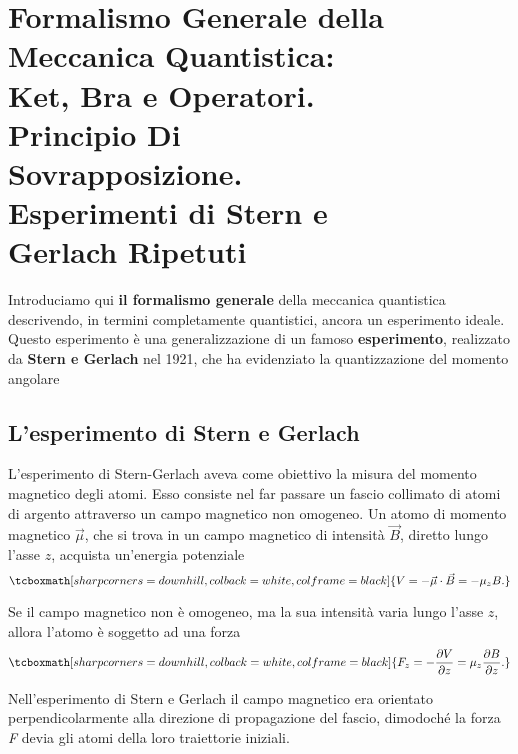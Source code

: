 \chapter[Formalismo Generale della M.Q.]{Formalismo Generale della Meccanica Quantistica: \\Ket, Bra e Operatori.\\Principio Di\\ Sovrapposizione.\\ Esperimenti di Stern e\\ Gerlach Ripetuti}
 
Introduciamo qui \textbf{il formalismo generale} della meccanica quantistica descrivendo, in termini completamente quantistici, ancora un esperimento ideale. Questo esperimento è una generalizzazione di un famoso \textbf{esperimento}, realizzato da \textbf{Stern e Gerlach} nel 1921, che ha evidenziato la quantizzazione del momento angolare
 
\section{L'esperimento di Stern e Gerlach}
L'esperimento di Stern-Gerlach aveva come obiettivo la misura del momento magnetico degli atomi. Esso consiste nel far passare un fascio collimato di atomi di argento attraverso un campo magnetico non omogeneo. Un atomo di momento magnetico $\vec \mu$, che si trova in un campo magnetico di intensità $\vec B$, diretto lungo l'asse $z$, acquista un'energia potenziale
	\begin{equation}
		\tcboxmath[sharp corners=downhill, colback=white, colframe=black]{
			V= -\vec \mu \cdot \vec B= -\mu_zB .
			}
	\end{equation} 

Se il campo magnetico non è omogeneo, ma la sua intensità varia lungo l'asse $z$, allora l'atomo è soggetto ad una forza
	\begin{equation}
		\tcboxmath[sharp corners=downhill, colback=white, colframe=black]{		
			F_z= - \frac{\partial V}{\partial z}= \mu_z\frac{\partial B}{\partial z} .
			}
\end{equation}

Nell'esperimento di Stern e Gerlach il campo magnetico era orientato perpendicolarmente alla direzione di propagazione del fascio, dimodoché la forza \emph{F} devia gli atomi della loro traiettorie iniziali.\\

